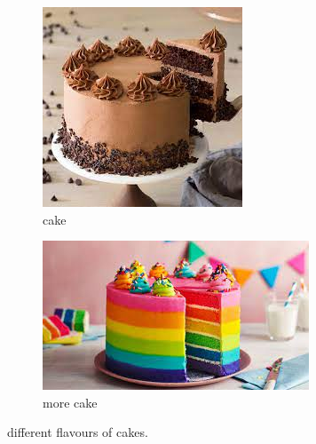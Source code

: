 \documentclass{article}
\begin{document}
	\begin{figure}[h!]
	 \centering
	 \begin{subfigure}[b]{0.4\linewidth}
	 	
	 \includegraphics[width=\linewidth]{cake.jpeg}
	 \caption{cake}
	  \end{subfigure}
  
  
  
  \begin{subfigure}[b]{0.4\linewidth}
  	
  	\includegraphics[width=\linewidth]{more cake.jpeg}
  	\caption{more cake}
  	 \end{subfigure}
		\caption{different flavours of cakes.}
		\label{fig:cake}
	\end{figure}
\end{document}
